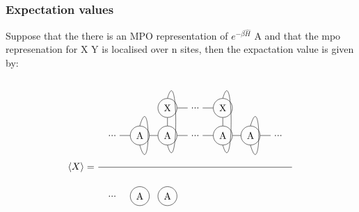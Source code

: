 \subsubsection{Expectation values}

Suppose that the there is an MPO representation of $ e^{ - \beta \hat{H} } $ A and that the mpo represenation for X Y is localised over n sites, then the expactation value is given by:

\begin{equation}
    \Braket{X} = \frac{
        \begin{tikzpicture} [   ]
            \clip (-1.5,-1) rectangle (5.5,2);

            \node[] (N0) at (-1,0) {...};
            \node[circle, draw] (N1) at (0,0) {A};
            \node[circle, draw] (N2) at (1,0) {A};
            \node[circle, draw] (X2) at (1,1) {X};

            \node[] (N3) at (2 ,0) {...};
            \node[] (X3) at (2,1) {...};

            \node[circle, draw] (N4) at (3 ,0) {A};
            \node[circle, draw] (X4) at (3,1) {X};

            \node[circle, draw] (N5) at (4 ,0) {A};
            \node[] (N6) at (5 ,0) {...};

            \draw  (N0) -- (N1) ;

            \draw  (N1) -- (N2) ;
            \draw  (N2) -- (N3) ;
            \draw  (N3) -- (N4) ;
            \draw  (N4) -- (N5) ;
            \draw  (N5) -- (N6) ;

            \draw  (X2) -- (X3) ;
            \draw  (X3) -- (X4) ;

            \draw  (N2) -- (X2) ;
            \draw  (N4) -- (X4) ;

            \draw (X2.north)   .. controls +(0.4,1.4) and +(0.4,-1.4) .. (N2.south);
            \draw (X4.north)   .. controls +(0.4,1.4) and +(0.4,-1.4) .. (N4.south);

            \draw (N1.north)   .. controls +(0.4,1.4) and +(0.4,-1.4) .. (N1.south);
            \draw (N5.north)   ..  controls +(0.4,1.4) and +(0.4,-1.4)  .. (N5.south);
        \end{tikzpicture}
    }{
        \begin{tikzpicture} [   ]

            \clip  (-1.5,-3) rectangle (5.5,-1);

            \node[] (O0) at (-1,-2) {...};
            \node[circle, draw] (O1) at (0,-2) {A};
            \node[circle, draw] (O2) at (1,-2) {A};


\end{tikzpicture}}
\end{equation}
